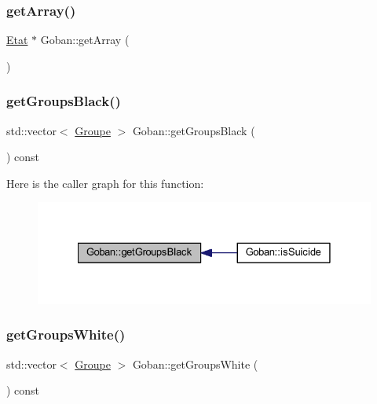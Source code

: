 \subsubsection{\texorpdfstring{get\+Array()}{getArray()}}
{\footnotesize\ttfamily \hyperlink{class_etat}{Etat} $\ast$ Goban\+::get\+Array (\begin{DoxyParamCaption}{ }\end{DoxyParamCaption})}

\mbox{\label{class_goban_a0a8ed1098b25c0c42cb5faadaa0605d4}} 
\subsubsection{\texorpdfstring{get\+Groups\+Black()}{getGroupsBlack()}}
{\footnotesize\ttfamily std\+::vector$<$ \hyperlink{class_groupe}{Groupe} $>$ Goban\+::get\+Groups\+Black (\begin{DoxyParamCaption}{ }\end{DoxyParamCaption}) const}

Here is the caller graph for this function\+:\nopagebreak
\begin{figure}[H]
\begin{center}
\leavevmode
\includegraphics[width=328pt]{class_goban_a0a8ed1098b25c0c42cb5faadaa0605d4_icgraph}
\end{center}
\end{figure}
\mbox{\label{class_goban_a0d5ecea357ff85e7d08f2c0855d83e6b}} 
\subsubsection{\texorpdfstring{get\+Groups\+White()}{getGroupsWhite()}}
{\footnotesize\ttfamily std\+::vector$<$ \hyperlink{class_groupe}{Groupe} $>$ Goban\+::get\+Groups\+White (\begin{DoxyParamCaption}{ }\end{DoxyParamCaption}) const}


